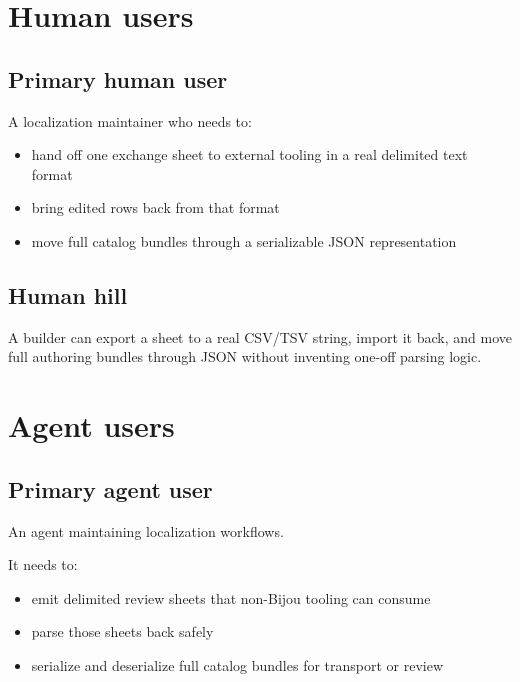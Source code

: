 \section{Human users}\label{record-191-human-users}

\subsection{Primary human user}\label{record-191-primary-human-user}

A localization maintainer who needs to:

\begin{itemize}
\tightlist
\item
  hand off one exchange sheet to external tooling in a real delimited text format
\item
  bring edited rows back from that format
\item
  move full catalog bundles through a serializable JSON representation
\end{itemize}

\subsection{Human hill}\label{record-191-human-hill}

A builder can export a sheet to a real CSV/TSV string, import it back, and move full authoring bundles through JSON without inventing one-off parsing logic.

\section{Agent users}\label{record-191-agent-users}

\subsection{Primary agent user}\label{record-191-primary-agent-user}

An agent maintaining localization workflows.

It needs to:

\begin{itemize}
\tightlist
\item
  emit delimited review sheets that non-Bijou tooling can consume
\item
  parse those sheets back safely
\item
  serialize and deserialize full catalog bundles for transport or review
\end{itemize}

